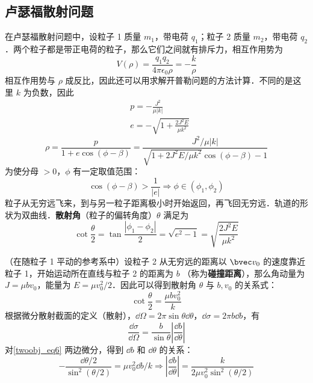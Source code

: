 \subsection{卢瑟福散射问题}
在卢瑟福散射问题中，设粒子 1 质量 $m_1$，带电荷 $q_1$；粒子 2 质量 $m_2$，带电荷 $q_2$．两个粒子都是带正电荷的粒子，那么它们之间就有排斥力，相互作用势为
\begin{equation}
V(\rho)=\frac{q_1q_2}{4\pi\epsilon_0\rho}=-\frac{k}{\rho}
\end{equation}
相互作用势与 $\rho$ 成反比，因此还可以用求解开普勒问题的方法计算．不同的是这里 $k$ 为负数，因此
\begin{equation}
\begin{aligned}
&p=-\frac{J^2}{\mu |k|}\\
&e=-\sqrt{1+\frac{2J^2E}{\mu k^2}}
\end{aligned}
\end{equation}
\begin{equation}
\rho=\frac{p}{1+e\cos(\phi-\beta)}=\frac{J^2/\mu |k|}{\sqrt{1+2J^2E/\mu k^2}\cos(\phi-\beta)-1}
\end{equation}
为使分母 $>0$，$\phi$ 有一定取值范围：
\begin{equation}
\cos(\phi-\beta)>\frac{1}{|e|}
\Rightarrow \phi \in (\phi_1,\phi_2)
\end{equation}
粒子从无穷远飞来，到与另一粒子距离极小时开始返回，再飞回无穷远．轨道的形状为双曲线．\textbf{散射角}（粒子的偏转角度）$\theta$ 满足为
\begin{equation}
\cot\frac{\theta}{2}=\tan\frac{|\phi_1-\phi_2|}{2} =\sqrt{e^2-1}=\sqrt{\frac{2J^2E}{\mu k^2}}
\end{equation}

（在随粒子 1 平动的参考系中）设粒子 2 从无穷远的距离以 $\bvec v_0$ 的速度靠近粒子 1，开始运动所在直线与粒子 2 的距离为 $b$ （称为\textbf{碰撞距离}），那么角动量为 $J=\mu bv_0$，能量为 $E=\mu v_0^2/2$．因此可以得到散射角 $\theta$ 与 $b,v_0$ 的关系式：
\begin{equation}\label{twoobj_eq6}
\cot \frac{\theta}{2}=\frac{\mu bv_0^2}{k}
\end{equation}
根据微分散射截面的定义（散射），$\dd \Omega=2\pi \sin\theta \dd \theta$，$\dd \sigma=2\pi b\dd b$，有
\begin{equation}
\frac{\dd \sigma}{\dd \Omega}=\frac{b}{\sin \theta}\left|\frac{\dd b}{\dd \theta}\right|
\end{equation}
对\autoref{twoobj_eq6} 两边微分，得到 $\dd b$ 和 $\dd \theta$ 的关系：
\begin{equation}
-\frac{\dd \theta/2}{\sin^2(\theta/2)}=\mu v_0^2\dd b/k\Rightarrow \left|\frac{\dd b}{\dd \theta}\right|=\frac{k}{2\mu v_0^2\sin^2(\theta/2)}
\end{equation}
